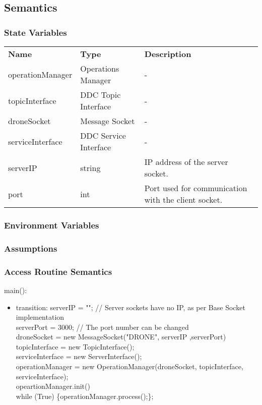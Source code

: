 \documentclass[12pt, titlepage]{article}
\begin{document}
\subsection{Semantics}
\subsubsection{State Variables}
\begin{center}
\begin{tabular}{p{3 cm} p{4cm} p{5cm} }
\hline
\textbf{Name} & \textbf{Type} & \textbf{Description}  \\
operationManager & Operations Manager & - \\
topicInterface & DDC Topic Interface & - \\
droneSocket & Message Socket & - \\
serviceInterface & DDC Service Interface & - \\
serverIP & string & IP address of the server socket. \\
port & int & Port used for communication with the client socket. \\
\hline
\hline
\end{tabular}
\end{center}
\subsubsection{Environment Variables}
\subsubsection{Assumptions}
\subsubsection{Access Routine Semantics}
\noindent main():
\begin{itemize}
\item transition: 
serverIP = ""; // Server sockets have no IP, as per Base Socket implementation \\
serverPort = 3000; // The port number can be changed \\
droneSocket = new MessageSocket("DRONE", serverIP ,serverPort)\\
topicInterface = new TopicInterface();\\
serviceInterface = new ServerInterface();\\
operationManager = new OperationManager(droneSocket, topicInterface, serviceInterface);\\
	opeartionManager.init() \\
	while (True) \{operationManager.process();\};
\end{itemize}
\end{document}

